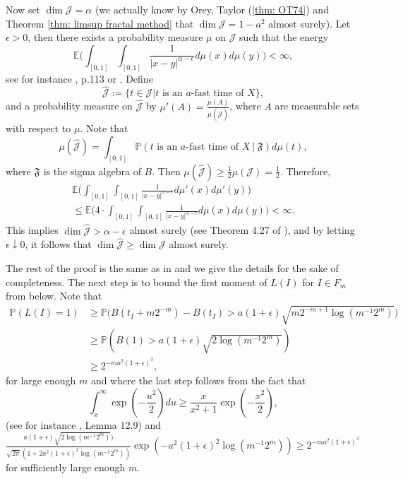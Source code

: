 \documentclass[11pt, reqno]{amsart}
\theoremstyle{plain}
\theoremstyle{definition}
\theoremstyle{remark}
\begin{document}
Now set $\dim {\mathcal{J}} = \alpha$ (we actually know by Orey, Taylor (\ref{thm: OT74}) and Theorem \ref{thm: limsup fractal method} that $\dim {\mathcal{J}} = 1- a^2$ almost surely). Let $\epsilon > 0$, then there exists a probability measure $\mu$ on ${\mathcal{J}}$ such that the energy 
$${\mathbb{E}} \Big( \int_{[0,1]} \int_{[0,1]}  \frac{1}{|x-y|^{\alpha-\epsilon}} d\mu (x) d\mu (y)  \Big) < \infty,$$
see for instance \cite{MP}, p.113 or \cite{Mattila}.
Define $$\hat{\mathcal{J}}:= \{ t \in {\mathcal{J}} | t \text{ is an } a\text{-fast time of } X \},$$ and a probability measure on $\hat{\mathcal{J}}$ by 
$\mu'(A) = \frac{\mu (A)}{\mu(\hat{\mathcal{J}})}$, where $A$ are measurable sets with respect to $\mu$. Note that 
$$\mu(\hat{\mathcal{J}}) = \int_{[0,1]} {\mathbb{P}} (t \text{ is an } a\text{-fast time of } X \ | \ {\mathfrak{F}}) d \mu (t), $$
where ${\mathfrak{F}}$ is the sigma algebra of $B$. Then $\mu(\hat{\mathcal{J}}) \geq \frac{1}{2} \mu({\mathcal{J}}) = \frac{1}{2}$. Therefore,
\begin{multline*}
 {\mathbb{E}} \Big( \int_{[0,1]} \int_{[0,1]}  \frac{1}{|x-y|^{\alpha-\epsilon}} d\mu' (x) d\mu' (y)  \Big)\\
\leq {\mathbb{E}} \Big( 4 \cdot \int_{[0,1]} \int_{[0,1]}  \frac{1}{|x-y|^{\alpha-\epsilon}} d\mu (x) d\mu (y)  \Big) < \infty.
\end{multline*}
This implies $\dim \hat{\mathcal{J}} > \alpha-\epsilon$ almost surely (see Theorem 4.27 of \cite{MP}), and by letting $\epsilon \downarrow 0$, it follows that $\dim \hat{\mathcal{J}} \geq \dim {\mathcal{J}}$ almost surely. 

The rest of the proof is the same as in \cite{MP} and we give the details for the sake of completeness. 
The next step is to bound the first moment of $L(I)$ for $I\in F_m$ from below. Note that 
\begin{align*}
{\mathbb{P}}(L(I) =1) &\geq {\mathbb{P}} \big(B(t_I+m2^{-m}) - B(t_I) > a(1+\epsilon)\sqrt{m2^{-m+1}\log(m^{-1}2^m)}\big)\\
&\geq {\mathbb{P}} (B(1) > a(1+\epsilon)\sqrt{2\log(m^{-1}2^m)})\\
&\geq 2^{-ma^2 (1+\epsilon)^3},
\end{align*}
for large enough $m$ and where the last step follows from the fact that $$\int_x^{\infty} \exp{(-\frac{u^2}{2})} du \geq \frac{x}{x^2 + 1}\exp{(-\frac{x^2}{2})},$$ (see for instance \cite{MP}, Lemma 12.9) and $\frac{a(1+\epsilon)\sqrt{2\log(m^{-1}2^m)})}{\sqrt{2\pi}(1+2a^2(1+\epsilon)^2\log(m^{-1}2^m))} \exp (-a^2 (1+\epsilon)^2 \log(m^{-1}2^m)) \geq 2^{-ma^2 (1+\epsilon)^3}$ for sufficiently large enough $m$.
\end{document}
